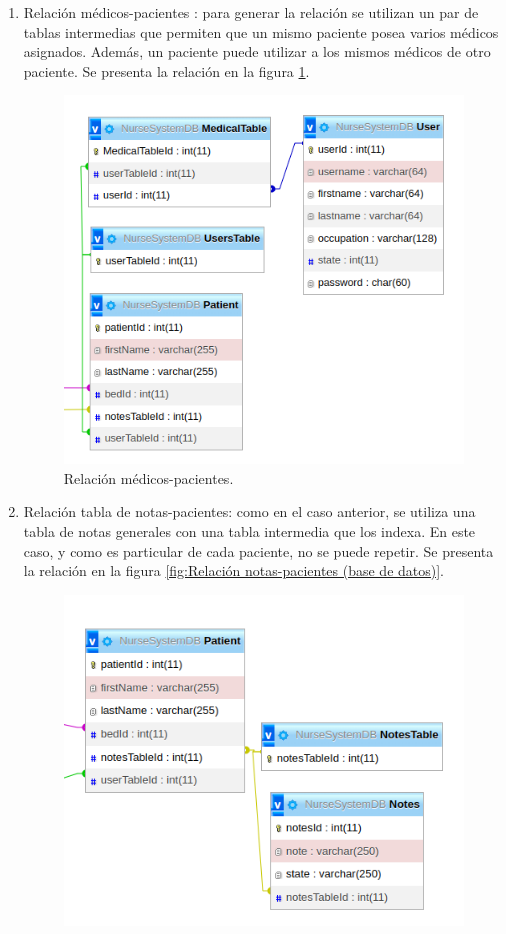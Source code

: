 \begin{enumerate}
\item Relación médicos-pacientes : para generar la relación se utilizan un par de tablas intermedias que permiten que un mismo paciente posea varios médicos asignados. Además, un paciente puede utilizar a los mismos médicos de otro paciente. Se presenta la relación en la figura \ref{fig:Relación médicos-pacientes}.
\begin{figure}[ht]
	\centering
	\includegraphics[scale=.65]{./Figures/tabla-medicos-pacientes.png}
	\caption{Relación médicos-pacientes.}
	\label{fig:Relación médicos-pacientes}
\end{figure}
\item Relación tabla de notas-pacientes: como en el caso anterior, se utiliza una tabla de notas generales con una tabla intermedia que los indexa. En este caso, y como es particular de cada paciente, no se puede repetir.  Se presenta la relación en la figura \ref{fig:Relación notas-pacientes (base de datos)}.
\begin{figure}[ht]
	\centering
	\includegraphics[scale=.65]{./Figures/patient-notes.png}

\end{figure}
\end{enumerate}
